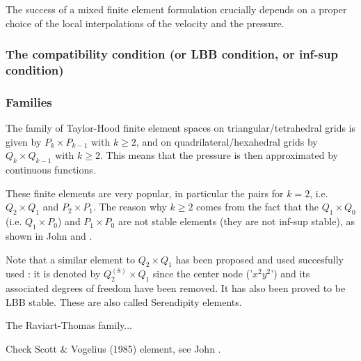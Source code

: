

The success of a mixed finite element formulation crucially depends on a proper choice of the local interpolations of the velocity and the pressure. 

\subsubsection{The compatibility condition (or LBB condition, or inf-sup condition)} \label{ss:LBBcond}
 




\subsubsection{Families}

The family of {\color{olive} Taylor-Hood} finite element spaces on triangular/tetrahedral 
grids is given by $P_k \times P_{k-1}$ with $k\geq 2$, 
and on quadrilateral/hexahedral grids by $Q_k \times Q_{k-1}$ with $k\geq 2$.
This means that the pressure is then approximated by continuous functions. 

These finite elements are very popular, in particular the pairs for $k=2$, i.e.
$Q_2\times Q_1$ and $P_2\times P_1$.
The reason why $k\geq 2$ comes from the fact that the 
$Q_1 \times Q_0$ (i.e. $Q_1 \times P_0$) and $P_1\times P_0$
are not stable elements (they are not inf-sup stable), as
shown in John \cite[p64]{john16} and \cite[p67]{john16}. 

\begin{remark}
Note that a similar element to $Q_2 \times Q_1$ has been proposed
and used succesfully used \cite{taho73,hota74}: it is denoted by $Q_2^{(8)} \times Q_1$ 
since the center node ('$x^2y^2$') and its associated degrees of freedom have been removed. It 
has also been proved to be LBB stable. These are also called {\color{olive} Serendipity} elements. 
\end{remark}

The {\color{olive} Raviart-Thomas} family... 

Check Scott \& Vogelius (1985) \cite{scvo85} element, see John \cite[p70]{john16}.

